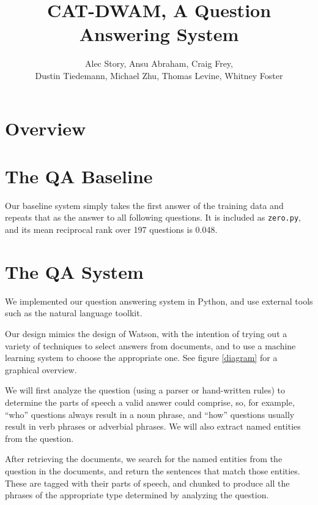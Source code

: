 \documentclass{article}
\title{CAT-DWAM, A Question Answering System}
\author{
Alec Story,
Ansu Abraham,
Craig Frey,\\
Dustin Tiedemann,
Michael Zhu,
Thomas Levine,
Whitney Foster\\
}
\begin{document}
\maketitle

\section{Overview}


\section{The QA Baseline}
Our baseline system simply takes the first answer of the training data and
repeats that as the answer to all following questions.  It is included as
\verb+zero.py+, and its mean reciprocal rank over 197 questions is 0.048.

\section{The QA System}

We implemented our question answering system in Python, and use external
tools such as the natural language toolkit.

Our design mimics the design of Watson, with the intention of trying out a
variety of techniques to select answers from documents, and to use a machine
learning system to choose the appropriate one.  See figure \ref{diagram} for
a graphical overview.

We will first analyze the question (using a parser or hand-written rules) to
determine the parts of speech a valid answer could comprise, so, for example,
``who'' questions always result in a noun phrase, and ``how'' questions usually
result in verb phrases or adverbial phrases.  We will also extract named entities
from the question.

After retrieving the documents, we search for the named entities from the
question in the documents, and return the sentences that match those entities.
These are tagged with their parts of speech, and chunked to produce all the
phrases of the appropriate type determined by analyzing the question.
\end{document}
